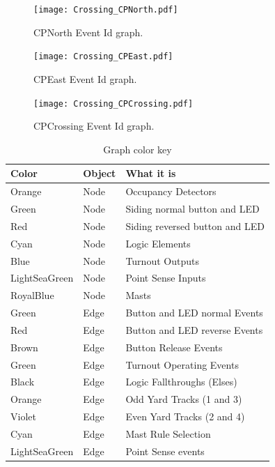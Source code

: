 \begin{figure}[hbpt]\begin{centering}%
\texttt{[image: Crossing\_CPNorth.pdf]}
\caption{CPNorth  Event Id graph.}
\label{fig:CrossingCPNorthEventFlow}
\end{centering}\end{figure}
\begin{figure}[hbpt]\begin{centering}%
\texttt{[image: Crossing\_CPEast.pdf]}
\caption{CPEast  Event Id graph.}
\label{fig:CrossingCPEastEventFlow}
\end{centering}\end{figure}
\begin{figure}[hbpt]\begin{centering}%
\texttt{[image: Crossing\_CPCrossing.pdf]}
\caption{CPCrossing Event Id graph.}
\label{fig:CrossingCPCrossing}
\end{centering}\end{figure}
\clearpage
\begin{table}[hbpt]\begin{centering}%
\begin{tabular}{|l|l|p{2in}|}
\hline
Color&Object&What it is\\
\hline
Orange&Node&Occupancy Detectors\\
\hline
Green&Node&Siding normal button and LED\\
\hline
Red&Node&Siding reversed button and LED\\
\hline
Cyan&Node&Logic Elements\\
\hline
Blue&Node&Turnout Outputs\\
\hline
LightSeaGreen&Node&Point Sense Inputs\\
\hline
RoyalBlue&Node&Masts\\
\hline 
Green&Edge&Button and LED normal Events\\
\hline
Red&Edge&Button and LED reverse Events\\
\hline
Brown&Edge&Button Release Events\\
\hline
Green&Edge&Turnout Operating Events\\
\hline
Black&Edge&Logic Fallthroughs (Elses)\\
\hline
Orange&Edge&Odd Yard Tracks (1 and 3)\\
\hline
Violet&Edge&Even Yard Tracks (2 and 4)\\
\hline
Cyan&Edge&Mast Rule Selection\\
\hline
LightSeaGreen&Edge&Point Sense events\\
\hline
\end{tabular}
\caption{Graph color key}
\label{tab:ExampleSidingCP1EventFlow}
\end{centering}\end{table}


\clearpage
